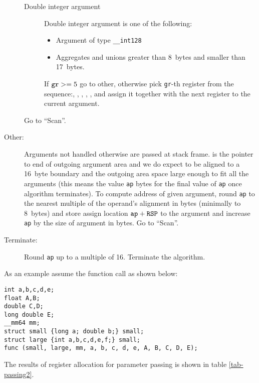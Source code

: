 \begin{description}
\begin{description}
    \item[Double integer argument]
      Double integer argument is one of the following:
      \begin{itemize}
        \item Argument of type \verb|__int128|
        \item Aggregates and unions greater than 8~bytes and smaller than 17~bytes.
      \end{itemize}
      If $\verb|gr| >= 5$ go to other, otherwise pick \verb|gr|-th register from
      the sequence:\RAX, \RDX, \RCX, \RBX, \RSI, \RDI{} and assign it together with the
      next register to the current argument.
   \end{description}
   Go to ``Scan''.

  \item[Other:]

    Arguments not handled otherwise are passed at stack frame. \RSP{} is the
    pointer to end of outgoing argument area and we do expect \RSP{} to be
    aligned to a 16~byte boundary and the outgoing area space large enough to fit all
    the arguments (this means the value \verb|ap| bytes for the final value of
    \verb|ap| once algorithm terminates).  To compute address of given argument,
    round \verb|ap| to the nearest multiple of the operand's alignment in bytes
    (minimally to 8~bytes) and
    store assign location $\verb|ap|+\RSP$ to the argument and increase \verb|ap| by
    the size of argument in bytes.
    Go to ``Scan''.

  \item[Terminate:]
    Round \verb|ap| up to a multiple of 16. Terminate the algorithm.
\end{description}

As an example assume the function call as shown below:

\begin{verbatim}
int a,b,c,d,e;
float A,B;
double C,D;
long double E;
__mm64 mm;
struct small {long a; double b;} small;
struct large {int a,b,c,d,e,f;} small;
func (small, large, mm, a, b, c, d, e, A, B, C, D, E);
\end{verbatim}

The results of register allocation for parameter passing is shown in table \ref{tab-passing2}.

